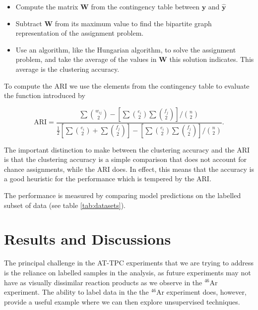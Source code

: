 \documentclass[review,number,sort&compress]{elsarticle}
\begin{document}
\begin{itemize}
    \item Compute the matrix $\mathbf{W}$ from the contingency table between $\mathbf{y}$ and $\mathbf{\hat{y}}$
    \item Subtract $\mathbf{W}$ from its maximum value to find the bipartite graph representation of the assignment problem.
    \item Use an algorithm, like the Hungarian algorithm, to solve the assignment problem, and take the average of the values in $\mathbf{W}$ this solution indicates. This average is the clustering accuracy. 
\end{itemize}

To compute the ARI we use the elements from the contingency table to evaluate the function introduced by \citet{Hubert1985}

\begin{equation}\label{eq:ari}
\text{ARI} = \frac{\sum  \binom{w_{ij}}{2} - \left[\sum  \binom{e_{i}}{2} \sum  \binom{f_{j}}{2}  \right]/\binom{n}{2}}{\frac{1}{2}\left[\sum  \binom{e_{i}}{2} + \sum  \binom{f_{j}}{2}  \right]- \left[\sum  \binom{e_{i}}{2} \sum  \binom{f_{j}}{2}  \right]/\binom{n}{2}}.
\end{equation}

The important distinction to make between the clustering accuracy and the ARI is that the clustering accuracy is a simple comparison that does not account for chance assignments, while the ARI does. In effect, this means that the accuracy is a good heuristic for the performance which is tempered by the ARI. 

The performance is measured by comparing model predictions on the labelled subset of data (see table \ref{tab:datasets}).


\section{Results and Discussions}\label{sec:results}

The principal challenge in the AT-TPC experiments that we are trying to address is the reliance on labelled samples in the analysis, as future experiments may not have as visually dissimilar reaction products as we observe in the ${}^{46}$Ar experiment.  The ability to label data in the the ${}^{46}$Ar experiment does, however, provide a useful example where we can then explore unsupervised techniques. 
\end{document}
